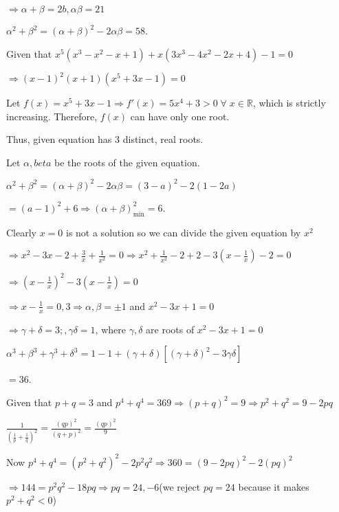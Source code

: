   $\Rightarrow \alpha + \beta = 2b, \alpha\beta = 21$

  $\alpha^2 + \beta^2 = (\alpha + \beta)^2 - 2\alpha\beta = 58$.
\item Given that $x^5\left(x^3 - x^2 - x + 1\right) + x\left(3x^3 - 4x^2 - 2x + 4\right) - 1 = 0$

  $\Rightarrow (x - 1)^2(x + 1)\left(x^5 + 3x - 1\right) = 0$

  Let $f(x) = x^5 + 3x - 1 \Rightarrow f'(x) = 5x^4 + 3 > 0\;\forall\;x\in\mathbb{R}$, which is strictly
  increasing. Therefore, $f(x)$ can have only one root.

  Thus, given equation has $3$ distinct, real roots.
\item Let $\alpha, beta$ be the roots of the given equation.

  $\alpha^2 + \beta^2 = (\alpha + \beta)^2 - 2\alpha\beta = (3 - a)^2 - 2(1 - 2a)$

  $= (a - 1)^2 + 6\Rightarrow \left(\alpha + \beta\right)_{\min}^2 = 6$.
\item Clearly $x = 0$ is not a solution so we can divide the given equation by $x^2$

  $\Rightarrow x^2 - 3x - 2+ \frac{3}{x} + \frac{1}{x^2} = 0 \Rightarrow x^2 + \frac{1}{x^2} - 2 + 2 -
  3\left(x - \frac{1}{x}\right) - 2 = 0$

  $\Rightarrow \left(x - \frac{1}{x}\right)^2 - 3\left(x - \frac{1}{x}\right) = 0$

  $\Rightarrow x - \frac{1}{x} = 0, 3 \Rightarrow \alpha, \beta = \pm 1$ and $x^2 - 3x + 1 = 0$

  $\Rightarrow \gamma + \delta = 3;,\gamma\delta = 1$, where $\gamma, \delta$ are roots of $x^2 - 3x + 1 = 0$

  $\alpha^3 + \beta^3 + \gamma^3 + \delta^3 = 1 - 1 + (\gamma + \delta)[(\gamma + \delta)^2 -
    3\gamma\delta]$

  $= 36$.
\item Given that $p + q = 3$ and $p^4 + q^4 = 369\Rightarrow (p + q)^2 = 9 \Rightarrow p^2 + q^2 = 9 - 2pq$

  $\frac{1}{\left(\frac{1}{p} + \frac{1}{q}\right)^2} = \frac{(qp)^2}{(q + p)^2} = \frac{(qp)^2}{9}$

  Now $p^4 + q^4 = \left(p^2 + q^2\right)^2 - 2p^2q^2 \Rightarrow 360 = \left(9 - 2pq\right)^2 - 2(pq)^2$

  $\Rightarrow 144 = p^2q^2 - 18pq \Rightarrow pq = 24, -6$(we reject $pq = 24$ because it makes $p^2 + q^2
  < 0$)

